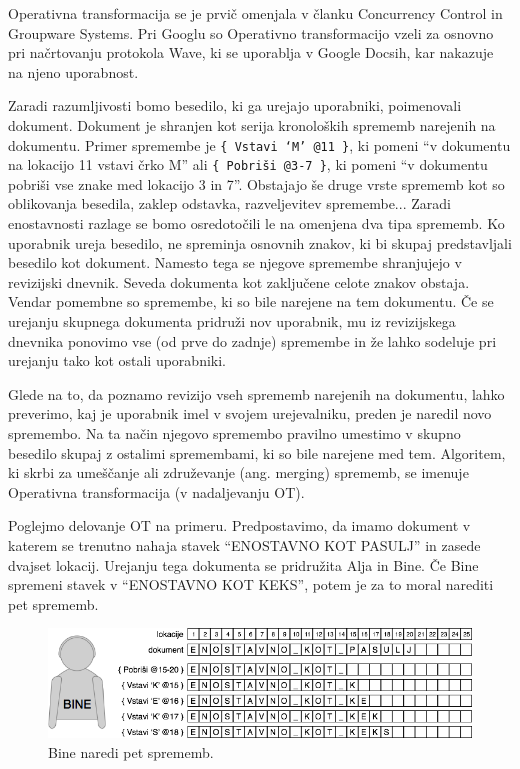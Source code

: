 \documentclass[a4paper, 12pt, twoside]{book}
\begin{document}
Operativna transformacija se je prvič omenjala v članku Concurrency Control in Groupware Systems. Pri Googlu so Operativno transformacijo vzeli za osnovno pri načrtovanju protokola Wave, ki se uporablja v Google Docsih, kar nakazuje na njeno uporabnost.

Zaradi razumljivosti bomo besedilo, ki ga urejajo uporabniki, poimenovali dokument. Dokument je shranjen kot serija kronoloških sprememb narejenih na dokumentu. Primer spremembe je {\tt \{ Vstavi ‘M’ @11 \}}, ki pomeni “v dokumentu na lokacijo 11 vstavi črko M” ali {\tt \{ Pobriši @3-7 \}}, ki pomeni “v dokumentu pobriši vse znake med lokacijo 3 in 7”. Obstajajo še druge vrste sprememb kot so oblikovanja besedila, zaklep odstavka, razveljevitev spremembe... Zaradi enostavnosti razlage se bomo osredotočili le na omenjena dva tipa sprememb. Ko uporabnik ureja besedilo, ne spreminja osnovnih znakov, ki bi skupaj predstavljali besedilo kot dokument. Namesto tega se njegove spremembe shranjujejo v revizijski dnevnik. Seveda dokumenta kot zaključene celote znakov obstaja. Vendar pomembne so spremembe, ki so bile narejene na tem dokumentu. Če se urejanju skupnega dokumenta pridruži nov uporabnik, mu iz revizijskega dnevnika ponovimo vse (od prve do zadnje) spremembe in že lahko sodeluje pri urejanju tako kot ostali uporabniki.

Glede na to, da poznamo revizijo vseh sprememb narejenih na dokumentu, lahko preverimo, kaj je uporabnik imel v svojem urejevalniku, preden je naredil novo spremembo. Na ta način njegovo spremembo pravilno umestimo v skupno besedilo skupaj z ostalimi spremembami, ki so bile narejene med tem. Algoritem, ki skrbi za umeščanje ali združevanje (ang. merging) sprememb, se imenuje Operativna transformacija (v nadaljevanju OT).

\bigskip

Poglejmo delovanje OT na primeru. Predpostavimo, da imamo dokument v katerem se trenutno nahaja stavek “ENOSTAVNO KOT PASULJ” in zasede dvajset lokacij. Urejanju tega dokumenta se pridružita Alja in Bine. Če Bine spremeni stavek v “ENOSTAVNO KOT KEKS”, potem je za to moral narediti pet sprememb.

\begin{figure}[placement h]
\begin{center}
\includegraphics[width=12cm]{ot1.png}
\end{center}
\caption{Bine naredi pet sprememb.}
\label{ot1}
\end{figure}
\end{document}
